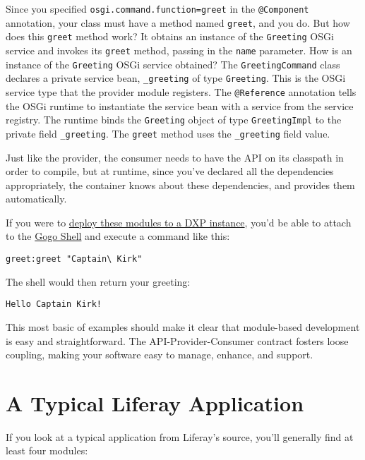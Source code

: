Since you specified \texttt{osgi.command.function=greet} in the
\texttt{@Component} annotation, your class must have a method named
\texttt{greet}, and you do. But how does this \texttt{greet} method
work? It obtains an instance of the \texttt{Greeting} OSGi service and
invokes its \texttt{greet} method, passing in the \texttt{name}
parameter. How is an instance of the \texttt{Greeting} OSGi service
obtained? The \texttt{GreetingCommand} class declares a private service
bean, \texttt{\_greeting} of type \texttt{Greeting}. This is the OSGi
service type that the provider module registers. The \texttt{@Reference}
annotation tells the OSGi runtime to instantiate the service bean with a
service from the service registry. The runtime binds the
\texttt{Greeting} object of type \texttt{GreetingImpl} to the private
field \texttt{\_greeting}. The \texttt{greet} method uses the
\texttt{\_greeting} field value.

Just like the provider, the consumer needs to have the API on its
classpath in order to compile, but at runtime, since you've declared all
the dependencies appropriately, the container knows about these
dependencies, and provides them automatically.

If you were to
\href{/docs/7-2/reference/-/knowledge_base/r/deploying-a-project}{deploy
these modules to a DXP instance}, you'd be able to attach to the
\href{/docs/7-2/customization/-/knowledge_base/c/using-the-felix-gogo-shell}{Gogo
Shell} and execute a command like this:

\begin{verbatim}
greet:greet "Captain\ Kirk"
\end{verbatim}

The shell would then return your greeting:

\begin{verbatim}
Hello Captain Kirk!
\end{verbatim}

This most basic of examples should make it clear that module-based
development is easy and straightforward. The API-Provider-Consumer
contract fosters loose coupling, making your software easy to manage,
enhance, and support.

\section{A Typical Liferay
Application}\label{a-typical-liferay-application}

If you look at a typical application from Liferay's source, you'll
generally find at least four modules:

